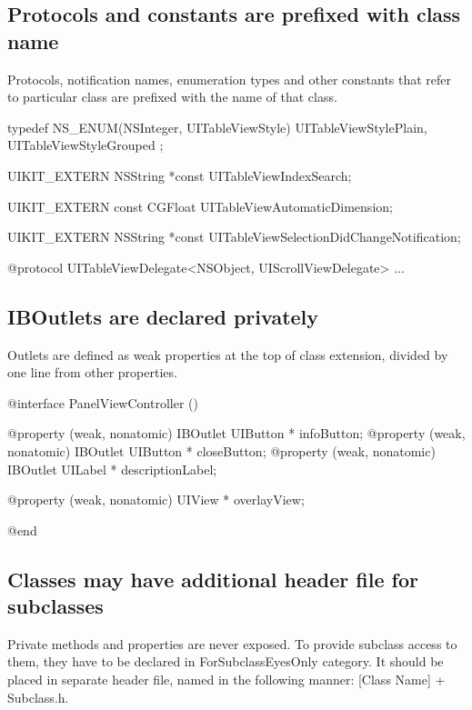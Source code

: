 \documentclass[10pt]{extarticle}
\newenvironment{codelisting}
{\footnotesize\mdframed[middlelinewidth=0.5pt, middlelinecolor=BaliHaiColor, skipabove=15pt]\verbatim}
{\endverbatim\endmdframed\vspace{12pt}\normalsize}
\begin{document}
\subsection{Protocols and constants are prefixed with class name}

Protocols, notification names, enumeration types and other constants that refer to particular class are prefixed with the name of that class.

\begin{codelisting}
typedef NS_ENUM(NSInteger, UITableViewStyle) {
    UITableViewStylePlain,
    UITableViewStyleGrouped
};

UIKIT_EXTERN NSString *const UITableViewIndexSearch;

UIKIT_EXTERN const CGFloat UITableViewAutomaticDimension;

UIKIT_EXTERN NSString *const UITableViewSelectionDidChangeNotification;

@protocol UITableViewDelegate<NSObject, UIScrollViewDelegate>
...
\end{codelisting}

\subsection{IBOutlets are declared privately}

Outlets are defined as weak properties at the top of class extension, divided by one line from other properties.

\begin{codelisting}
@interface PanelViewController ()

@property (weak, nonatomic) IBOutlet UIButton * infoButton;
@property (weak, nonatomic) IBOutlet UIButton * closeButton;
@property (weak, nonatomic) IBOutlet UILabel * descriptionLabel;

@property (weak, nonatomic) UIView * overlayView;

@end
\end{codelisting}


\subsection{Classes may have additional header file for subclasses}

Private methods and properties are never exposed. To provide subclass access to them, they have to be declared in ForSubclassEyesOnly category. It should be placed in separate header file, named in the following manner: [Class Name] + Subclass.h. 
\end{document}
